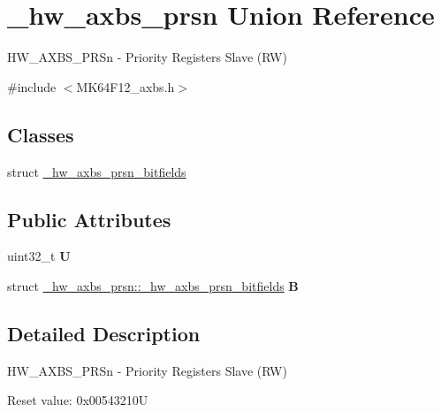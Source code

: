 \hypertarget{union__hw__axbs__prsn}{}\section{\+\_\+hw\+\_\+axbs\+\_\+prsn Union Reference}
\label{union__hw__axbs__prsn}


H\+W\+\_\+\+A\+X\+B\+S\+\_\+\+P\+R\+Sn -\/ Priority Registers Slave (RW)  




{\ttfamily \#include $<$M\+K64\+F12\+\_\+axbs.\+h$>$}

\subsection*{Classes}
\begin{DoxyCompactItemize}
\item 
struct \hyperlink{struct__hw__axbs__prsn_1_1__hw__axbs__prsn__bitfields}{\+\_\+hw\+\_\+axbs\+\_\+prsn\+\_\+bitfields}
\end{DoxyCompactItemize}
\subsection*{Public Attributes}
\begin{DoxyCompactItemize}
\item 
uint32\+\_\+t {\bfseries U}\hypertarget{union__hw__axbs__prsn_ae7fa03833fc567868e1154c0ee9bea89}{}\label{union__hw__axbs__prsn_ae7fa03833fc567868e1154c0ee9bea89}

\item 
struct \hyperlink{struct__hw__axbs__prsn_1_1__hw__axbs__prsn__bitfields}{\+\_\+hw\+\_\+axbs\+\_\+prsn\+::\+\_\+hw\+\_\+axbs\+\_\+prsn\+\_\+bitfields} {\bfseries B}\hypertarget{union__hw__axbs__prsn_a574a10f846d92f54da9440b097909a44}{}\label{union__hw__axbs__prsn_a574a10f846d92f54da9440b097909a44}

\end{DoxyCompactItemize}


\subsection{Detailed Description}
H\+W\+\_\+\+A\+X\+B\+S\+\_\+\+P\+R\+Sn -\/ Priority Registers Slave (RW) 

Reset value\+: 0x00543210U

